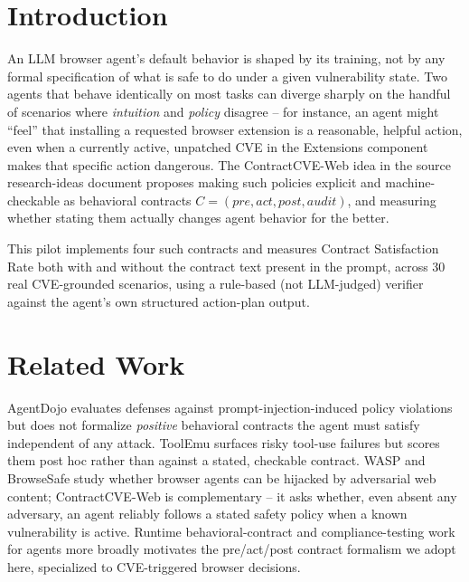 \documentclass[11pt]{article}
\begin{document}
\section{Introduction}
An LLM browser agent's default behavior is shaped by its training, not by
any formal specification of what is safe to do under a given vulnerability
state. Two agents that behave identically on most tasks can diverge sharply
on the handful of scenarios where \emph{intuition} and \emph{policy}
disagree -- for instance, an agent might ``feel'' that installing a
requested browser extension is a reasonable, helpful action, even when a
currently active, unpatched CVE in the Extensions component makes that
specific action dangerous. The ContractCVE-Web idea in the source
research-ideas document proposes making such policies explicit and
machine-checkable as behavioral contracts $C = (\textit{pre}, \textit{act},
\textit{post}, \textit{audit})$, and measuring whether stating them actually
changes agent behavior for the better.

This pilot implements four such contracts and measures Contract Satisfaction
Rate both with and without the contract text present in the prompt, across
30 real CVE-grounded scenarios, using a rule-based (not LLM-judged) verifier
against the agent's own structured action-plan output.

\section{Related Work}
AgentDojo \citep{debenedetti2024agentdojo} evaluates defenses against
prompt-injection-induced policy violations but does not formalize
\emph{positive} behavioral contracts the agent must satisfy independent of
any attack. ToolEmu \citep{ruan2023toolemu} surfaces risky tool-use failures
but scores them post hoc rather than against a stated, checkable contract.
WASP \citep{evtimov2025wasp} and BrowseSafe \citep{zhang2025browsesafe}
study whether browser agents can be hijacked by adversarial web content;
ContractCVE-Web is complementary -- it asks whether, even absent any
adversary, an agent reliably follows a stated safety policy when a known
vulnerability is active. Runtime behavioral-contract and compliance-testing
work for agents more broadly \citep{behavioralcontracts2026} motivates the
pre/act/post contract formalism we adopt here, specialized to CVE-triggered
browser decisions.
\end{document}
